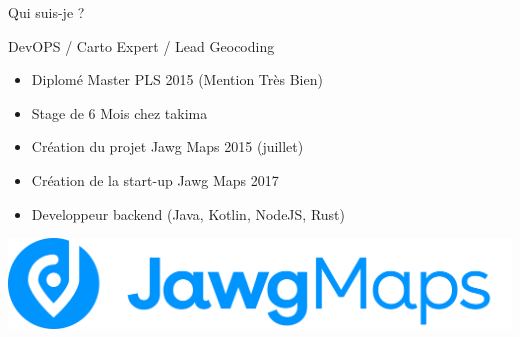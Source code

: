 \begin{frame}{Qui suis-je ?}

\begin{block}{DevOPS / Carto Expert / Lead Geocoding}
  \begin{itemize}
    \item Diplomé Master PLS 2015 (Mention Très Bien)
    \item Stage de 6 Mois chez takima
    \item Création du projet Jawg Maps 2015 (juillet)
    \item Création de la start-up Jawg Maps 2017
    \item Developpeur backend (Java, Kotlin, NodeJS, Rust)
  \end{itemize}
  \centering
  \begin{minipage}{0.33\paperwidth}
    \includegraphics[width=\textwidth,keepaspectratio]{images/jawg.png}
  \end{minipage}
\end{block}

\end{frame}

